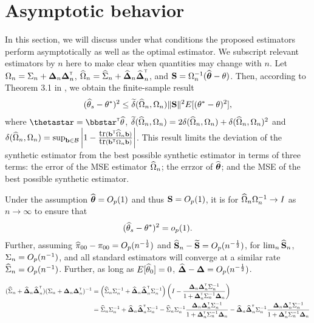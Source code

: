 \documentclass{article}
\begin{document}
\section{Asymptotic behavior}
In this section, we will discuss under what conditions the proposed estimators perform asymptotically as well as the optimal estimator. We subscript relevant estimators by $n$ here to make clear when quantities may change with $n$. Let $\Omega_n = \Sigma_n + \boldsymbol{\Delta}_n\boldsymbol{\Delta}_n^{{\sf \scriptscriptstyle{T}}}$, ${\widehat\Omega}_n = {\widehat\Sigma}_n + {\widehat{\boldsymbol{\Delta}}}_n{\widehat{\boldsymbol{\Delta}}}_n^{{\sf \scriptscriptstyle{T}}}$, and ${\bf S} = \Omega_n^{-1}({\widehat{\boldsymbol{\theta}}} - \theta)$. Then, according to Theorem 3.1 in \cite{lavancier2016general}, we obtain the finite-sample result
\begin{align*}
    ({\widehat\theta}_s - \theta^*)^2 \leq {\widetilde\delta}({\widehat\Omega}_n, \Omega_n) \|{\bf S}\|^2 E[(\theta^* - \theta)^2],
\end{align*}
where $\thetastar = \bbstar\trans\thetahat$, ${\widetilde\delta}({\widehat\Omega}_n, \Omega_n) = 2\delta({\widehat\Omega}_n, \Omega_n) + \delta({\widehat\Omega}_n, \Omega_n)^2$ and $\delta({\widehat\Omega}_n, \Omega_n) = \sup_{{\bf b} \in {\cal B}}\left|1 - \frac{\mbox{tr}({\bf b}^{{\sf \scriptscriptstyle{T}}}{\widehat\Omega}_n{\bf b})}{\mbox{tr}({\bf b}^{{\sf \scriptscriptstyle{T}}}\Omega_n{\bf b})}\right|$. This result limits the deviation of the synthetic estimator from the best possible synthetic estimator in terms of three terms: the error of the MSE estimator ${\widehat\Omega}_n$; the errzor of ${\widehat{\boldsymbol{\theta}}}$; and the MSE of the best possible synthetic estimator.

Under the assumption ${\widehat{\boldsymbol{\theta}}} = O_p(1)$ and thus ${\bf S} = O_p(1)$, it is for ${\widehat\Omega}_n\Omega_n^{-1} \rightarrow I$ as $n \rightarrow \infty$ to ensure that 
\begin{align}
    ({\widehat\theta}_s - \theta^*)^2 = o_p(1).
\end{align}
Further, assuming ${\widehat\pi}_{00} - \pi_{00} = O_p(n^{-\frac{1}{2}})$ and ${\widehat {{\bf S}}}_n - {\widetilde {{\bf S}}} = O_p(n^{-\frac{1}{2}})$, for $\lim_n {\widehat {{\bf S}}}_n$, $\Sigma_n = O_p(n^{-1})$, and all standard estimators will converge at a similar rate ${\widehat\Sigma}_n = O_p(n^{-1})$. Further, as long as $E[{\widehat\theta}_0] = 0$, ${\widehat{\boldsymbol{\Delta}}} - \boldsymbol{\Delta} = O_p(n^{-\frac{1}{2}})$. 

\def\ddp{\bDelta_n\bDelta_n\trans}
\def\ddhp{\bDeltahat_n\bDeltahat_n\trans}
\def\dsd{\bDelta_n\trans\Sigma_n\inv\bDelta_n}
\begin{align*}
    (\Sigmahat_n + \ddhp)(\Sigma_n + \ddp)\inv &= \left(\Sigmahat_n\Sigma_n\inv + \ddhp\Sigma_n\inv\right)\left(I - \frac{ \ddp\Sigma_n\inv}{1 +\dsd}\right)\\
    &= \Sigmahat_n\Sigma_n\inv +\ddhp\Sigma_n\inv - \Sigmahat_n\Sigma_n\inv\frac{ \ddp\Sigma_n\inv}{1 +\dsd} - \ddhp\Sigma_n\inv\frac{ \ddp\Sigma_n\inv}{1 +\dsd}
\end{align*}
\end{document}
